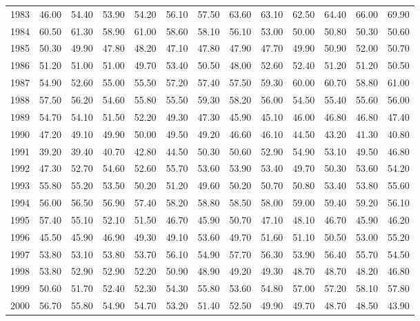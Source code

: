 \begin{longtable}{rrrrrrrrrrrrr}
  1983 & 46.00 & 54.40 & 53.90 & 54.20 & 56.10 & 57.50 & 63.60 & 63.10 & 62.50 & 64.40 & 66.00 & 69.90 \\ 
  1984 & 60.50 & 61.30 & 58.90 & 61.00 & 58.60 & 58.10 & 56.10 & 53.00 & 50.00 & 50.80 & 50.30 & 50.60 \\ 
  1985 & 50.30 & 49.90 & 47.80 & 48.20 & 47.10 & 47.80 & 47.90 & 47.70 & 49.90 & 50.90 & 52.00 & 50.70 \\ 
  1986 & 51.20 & 51.00 & 51.00 & 49.70 & 53.40 & 50.50 & 48.00 & 52.60 & 52.40 & 51.20 & 51.20 & 50.50 \\ 
  1987 & 54.90 & 52.60 & 55.00 & 55.50 & 57.20 & 57.40 & 57.50 & 59.30 & 60.00 & 60.70 & 58.80 & 61.00 \\ 
  1988 & 57.50 & 56.20 & 54.60 & 55.80 & 55.50 & 59.30 & 58.20 & 56.00 & 54.50 & 55.40 & 55.60 & 56.00 \\ 
  1989 & 54.70 & 54.10 & 51.50 & 52.20 & 49.30 & 47.30 & 45.90 & 45.10 & 46.00 & 46.80 & 46.80 & 47.40 \\ 
  1990 & 47.20 & 49.10 & 49.90 & 50.00 & 49.50 & 49.20 & 46.60 & 46.10 & 44.50 & 43.20 & 41.30 & 40.80 \\ 
  1991 & 39.20 & 39.40 & 40.70 & 42.80 & 44.50 & 50.30 & 50.60 & 52.90 & 54.90 & 53.10 & 49.50 & 46.80 \\ 
  1992 & 47.30 & 52.70 & 54.60 & 52.60 & 55.70 & 53.60 & 53.90 & 53.40 & 49.70 & 50.30 & 53.60 & 54.20 \\ 
  1993 & 55.80 & 55.20 & 53.50 & 50.20 & 51.20 & 49.60 & 50.20 & 50.70 & 50.80 & 53.40 & 53.80 & 55.60 \\ 
  1994 & 56.00 & 56.50 & 56.90 & 57.40 & 58.20 & 58.80 & 58.50 & 58.00 & 59.00 & 59.40 & 59.20 & 56.10 \\ 
  1995 & 57.40 & 55.10 & 52.10 & 51.50 & 46.70 & 45.90 & 50.70 & 47.10 & 48.10 & 46.70 & 45.90 & 46.20 \\ 
  1996 & 45.50 & 45.90 & 46.90 & 49.30 & 49.10 & 53.60 & 49.70 & 51.60 & 51.10 & 50.50 & 53.00 & 55.20 \\ 
  1997 & 53.80 & 53.10 & 53.80 & 53.70 & 56.10 & 54.90 & 57.70 & 56.30 & 53.90 & 56.40 & 55.70 & 54.50 \\ 
  1998 & 53.80 & 52.90 & 52.90 & 52.20 & 50.90 & 48.90 & 49.20 & 49.30 & 48.70 & 48.70 & 48.20 & 46.80 \\ 
  1999 & 50.60 & 51.70 & 52.40 & 52.30 & 54.30 & 55.80 & 53.60 & 54.80 & 57.00 & 57.20 & 58.10 & 57.80 \\ 
  2000 & 56.70 & 55.80 & 54.90 & 54.70 & 53.20 & 51.40 & 52.50 & 49.90 & 49.70 & 48.70 & 48.50 & 43.90 \\ 

\end{longtable}
